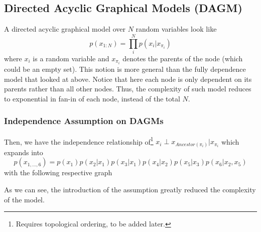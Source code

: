 \documentclass[11pt]{article}
\newcommand{\independent}{\perp}
\begin{document}
\subsection{Directed Acyclic Graphical Models (DAGM)}
A directed acyclic graphical model over $N$ random variables look like
\begin{equation*}
    p\left(x_{1:N}\right)=\prod_{i}^{N} p\left(x_{i} | x_{\pi_{i}}\right)
\end{equation*}
where $x_i$ is a random variable and $x_{\pi_i}$ denotes the parents of the node (which could be an empty set). This notion is more general than the fully dependence model that looked at above. Notice that here each node is only dependent on its parents rather than all other nodes. Thus, the complexity of such model reduces to exponential in fan-in of each node, instead of the total $N$. 

\subsubsection{Independence Assumption on DAGMs}
Then, we have the independence relationship of\footnote{Requires topological ordering, to be added later. }
$
    x_i \independent x_{Ancestor({\pi_i})} \vert x_{\pi_i}
$
which expands into
\begin{equation*}
    p\left(x_{1, \ldots, 6}\right)=p\left(x_{1}\right) p\left(x_{2} | x_{1}\right) p\left(x_{3} | x_{1}\right) p\left(x_{4} | x_{2}\right) p\left(x_{5} | x_{3}\right) p\left(x_{6} | x_{2}, x_{5}\right)
\end{equation*}
with the following respective graph
\begin{center}
\end{center}
As we can see, the introduction of the assumption greatly reduced the complexity of the model. 
\end{document}
